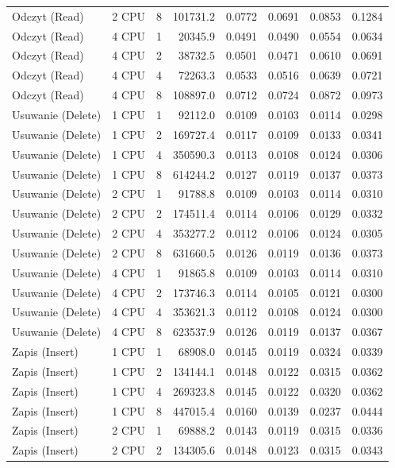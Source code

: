 \begin{table}[ht]
{\begin{tabular}{llcrrrrr}
Odczyt (Read) & 2 CPU & 8 & 101731.2 & 0.0772 & 0.0691 & 0.0853 & 0.1284 \\
Odczyt (Read) & 4 CPU & 1 & 20345.9 & 0.0491 & 0.0490 & 0.0554 & 0.0634 \\
Odczyt (Read) & 4 CPU & 2 & 38732.5 & 0.0501 & 0.0471 & 0.0610 & 0.0691 \\
Odczyt (Read) & 4 CPU & 4 & 72263.3 & 0.0533 & 0.0516 & 0.0639 & 0.0721 \\
Odczyt (Read) & 4 CPU & 8 & 108897.0 & 0.0712 & 0.0724 & 0.0872 & 0.0973 \\
Usuwanie (Delete) & 1 CPU & 1 & 92112.0 & 0.0109 & 0.0103 & 0.0114 & 0.0298 \\
Usuwanie (Delete) & 1 CPU & 2 & 169727.4 & 0.0117 & 0.0109 & 0.0133 & 0.0341 \\
Usuwanie (Delete) & 1 CPU & 4 & 350590.3 & 0.0113 & 0.0108 & 0.0124 & 0.0306 \\
Usuwanie (Delete) & 1 CPU & 8 & 614244.2 & 0.0127 & 0.0119 & 0.0137 & 0.0373 \\
Usuwanie (Delete) & 2 CPU & 1 & 91788.8 & 0.0109 & 0.0103 & 0.0114 & 0.0310 \\
Usuwanie (Delete) & 2 CPU & 2 & 174511.4 & 0.0114 & 0.0106 & 0.0129 & 0.0332 \\
Usuwanie (Delete) & 2 CPU & 4 & 353277.2 & 0.0112 & 0.0106 & 0.0124 & 0.0305 \\
Usuwanie (Delete) & 2 CPU & 8 & 631660.5 & 0.0126 & 0.0119 & 0.0136 & 0.0373 \\
Usuwanie (Delete) & 4 CPU & 1 & 91865.8 & 0.0109 & 0.0103 & 0.0114 & 0.0310 \\
Usuwanie (Delete) & 4 CPU & 2 & 173746.3 & 0.0114 & 0.0105 & 0.0121 & 0.0300 \\
Usuwanie (Delete) & 4 CPU & 4 & 353621.3 & 0.0112 & 0.0108 & 0.0124 & 0.0300 \\
Usuwanie (Delete) & 4 CPU & 8 & 623537.9 & 0.0126 & 0.0119 & 0.0137 & 0.0367 \\
Zapis (Insert) & 1 CPU & 1 & 68908.0 & 0.0145 & 0.0119 & 0.0324 & 0.0339 \\
Zapis (Insert) & 1 CPU & 2 & 134144.1 & 0.0148 & 0.0122 & 0.0315 & 0.0362 \\
Zapis (Insert) & 1 CPU & 4 & 269323.8 & 0.0145 & 0.0122 & 0.0320 & 0.0362 \\
Zapis (Insert) & 1 CPU & 8 & 447015.4 & 0.0160 & 0.0139 & 0.0237 & 0.0444 \\
Zapis (Insert) & 2 CPU & 1 & 69888.2 & 0.0143 & 0.0119 & 0.0315 & 0.0336 \\
Zapis (Insert) & 2 CPU & 2 & 134305.6 & 0.0148 & 0.0123 & 0.0315 & 0.0343 \\

\end{tabular}}
\end{table}
